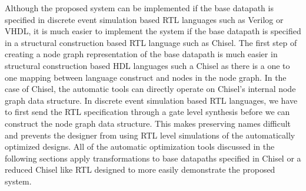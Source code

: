 Although the proposed system can be implemented if the base datapath is specified in discrete event simulation based RTL languages such as Verilog or VHDL, it is much easier to implement the system if the base datapath is specified in a structural construction based RTL language such as Chisel. The first step of creating a node graph representation of the base datapath is much easier in structural construction based HDL languages such a Chisel as there is a one to one mapping between language construct and nodes in the node graph. In the case of Chisel, the automatic tools can directly operate on Chisel’s internal node graph data structure. In discrete event simulation based RTL languages, we have to first send the RTL specification through a gate level synthesis before we can construct the node graph data structure. This makes preserving names difficult and prevents the designer from using RTL level simulations of the automatically optimized designs. All of the automatic optimization tools discussed in the following sections apply transformations to base datapaths specified in Chisel or a reduced Chisel like RTL designed to more easily demonstrate the proposed system.

